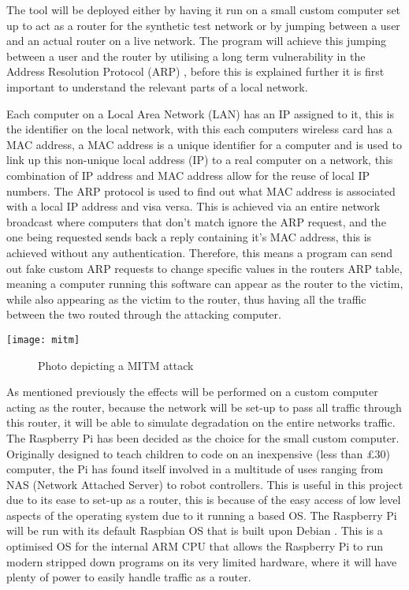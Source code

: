 The tool will be deployed either by having it run on a small custom computer set up to act as a router for the synthetic test network or by jumping between a user and an actual router on a live network. The program will achieve this jumping between a user and the router by utilising a long term vulnerability in the Address Resolution Protocol (ARP) \citep{arp2001}, before this is explained further it is first important to understand the relevant parts of a local network.

Each computer on a Local Area Network (LAN) has an IP assigned to it, this is the identifier on the local network, with this each computers wireless card has a MAC address, a MAC address is a unique identifier for a computer and is used to link up this non-unique local address (IP) to a real computer on a network, this combination of IP address and MAC address allow for the reuse of local IP numbers. The ARP protocol is used to find out what MAC address is associated with a local IP address and visa versa. This is achieved via an entire network broadcast where computers that don't match ignore the ARP request, and the one being requested sends back a reply containing it's MAC address, this is achieved without any authentication. Therefore, this means a program can send out fake custom ARP requests to change specific values in the routers ARP table, meaning a computer running this software can appear as the router to the victim, while also appearing as the victim to the router, thus having all the traffic between the two routed through the attacking computer. 

\begin{center}
\texttt{[image: mitm]}
	\begin{figure}[h]
		\caption{Photo depicting a MITM attack}
	\end{figure}
\end{center}

As mentioned previously the effects will be performed on a custom computer acting as the router, because the network will be set-up to pass all traffic through this router, it will be able to simulate degradation on the entire networks traffic.
The Raspberry Pi \citep{upton2014raspberry} has been decided as the choice for the small custom computer. Originally designed to teach children to code on an inexpensive (less than £30) computer, the Pi has found itself involved in a multitude of uses ranging from NAS (Network Attached Server) to robot controllers. This is useful in this project due to its ease to set-up as a router, this is because of the easy access of low level aspects of the operating system due to it running a based OS. The Raspberry Pi will be run with its default Raspbian OS \citep{pi2014raspbian} that is built upon Debian \citep{murdock1994overview}. This is a optimised OS for the internal ARM CPU that allows the Raspberry Pi to run modern stripped down programs on its very limited hardware, where it will have plenty of power to easily handle traffic as a router.

